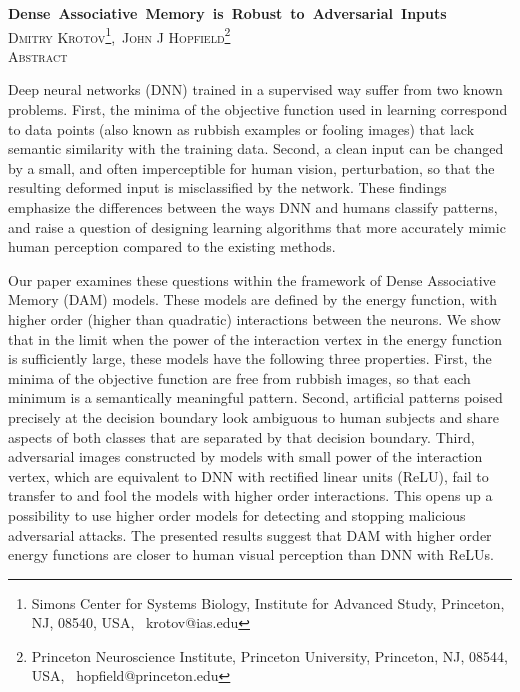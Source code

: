 \documentclass[12pt]{article} %
\begin{document}
\newcommand{\HRule}{\rule{0.9\linewidth}{0.5mm}} %


\begin{center}
{ \Large \bfseries Dense~Associative~Memory~is~Robust~to~Adversarial~Inputs} \\[0.10cm] %
\vspace{0.3cm}
\textsc{\large Dmitry Krotov\footnote{Simons Center for Systems Biology, Institute for Advanced Study, Princeton, NJ, 08540, USA, \  krotov@ias.edu},\ John J Hopfield\footnote{Princeton Neuroscience Institute, Princeton University, Princeton, NJ, 08544, USA, \ hopfield@princeton.edu}}\\[0.15cm]
\vspace{0.3cm}
\textsc{\large Abstract}\\[0.15cm]
\vspace{-0.0cm}
\end{center}


Deep neural networks (DNN) trained in a supervised way suffer from two known problems. First, the minima of the objective function used in learning correspond to data points (also known as rubbish examples or fooling images) that lack semantic similarity with the training data. Second, a clean input can be changed by a small, and often imperceptible for human vision, perturbation, so that the resulting deformed input is misclassified by the network. These findings emphasize the differences between the ways DNN and humans classify patterns, and raise a question of designing learning algorithms that more accurately mimic human perception compared to the existing methods.  
  
Our paper examines these questions within the framework of Dense Associative Memory (DAM) models. These models are defined by the energy function, with higher order (higher than quadratic) interactions between the neurons. We show that in the limit when the power of the interaction vertex in the energy function is sufficiently large, these models have the following three properties. First, the minima of the objective function are free from rubbish images, so that each minimum is a semantically meaningful pattern. Second, artificial patterns poised precisely at the decision boundary look ambiguous to human subjects and share aspects of both classes that are separated by that decision boundary. Third, adversarial images constructed by models with small power of the interaction vertex, which are equivalent to DNN with rectified linear units (ReLU), fail to transfer to and fool the models with higher order interactions. This opens up a possibility to use higher order models for detecting and stopping malicious adversarial attacks. The presented results suggest that DAM with higher order energy functions are closer to human visual perception than DNN with ReLUs.   
  
\end{document}
